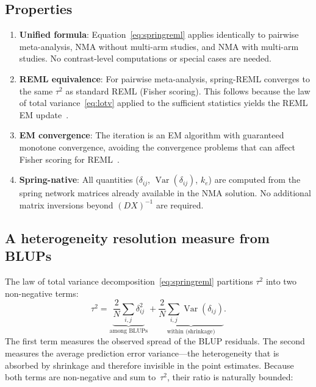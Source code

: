 \documentclass[12pt]{article}
\newcommand{\Var}{\operatorname{Var}}
\begin{document}
\subsection{Properties}

\begin{enumerate}
  \item \textbf{Unified formula}: Equation~\eqref{eq:springreml} applies
    identically to pairwise meta-analysis, NMA without multi-arm studies,
    and NMA with multi-arm studies.  No contrast-level computations or
    special cases are needed.

  \item \textbf{REML equivalence}: For pairwise meta-analysis,
    spring-REML converges to the same $\tau^2$ as standard REML (Fisher
    scoring).  This follows because the law of total
    variance~\eqref{eq:lotv} applied to the sufficient statistics yields
    the REML EM update~\citep{Karl2026,Henderson1975}.

  \item \textbf{EM convergence}: The iteration is an EM algorithm with
    guaranteed monotone convergence, avoiding the convergence problems
    that can affect Fisher scoring for
    REML~\citep{Viechtbauer2005convergence}.

  \item \textbf{Spring-native}: All quantities ($\delta_{ij}$,
    $\Var(\delta_{ij})$, $k_e$) are computed from the spring network
    matrices already available in the NMA solution.  No additional matrix
    inversions beyond $(DX)^{-1}$ are required.
\end{enumerate}

\subsection{A heterogeneity resolution measure from BLUPs}\label{sec:i2blup}

The law of total variance decomposition~\eqref{eq:springreml}
partitions $\tau^2$ into two non-negative terms:
\begin{equation}\label{eq:tau2decomp}
  \tau^2 = \underbrace{\frac{2}{N}\sum_{i,j}\delta_{ij}^2}_{\text{among BLUPs}}
         + \underbrace{\frac{2}{N}\sum_{i,j}\Var(\delta_{ij})}_{\text{within (shrinkage)}}.
\end{equation}
The first term measures the observed spread of the BLUP residuals.
The second measures the average prediction error variance---the
heterogeneity that is absorbed by shrinkage and therefore invisible in
the point estimates.  Because both terms are non-negative and sum
to~$\tau^2$, their ratio is naturally bounded:
\end{document}
